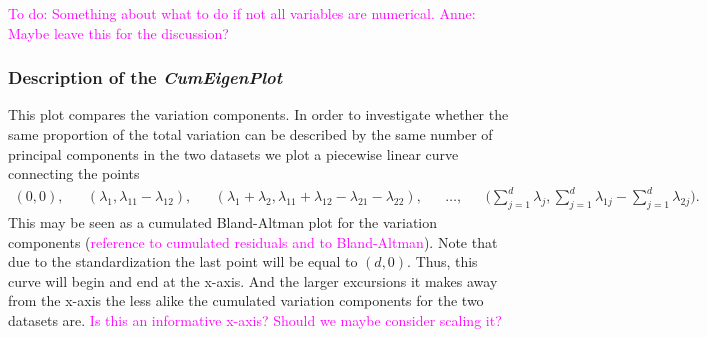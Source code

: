 \documentclass[titlepage,11pt,twoside]{article}
\newcommand{\hl}[1]{\textcolor{magenta}{#1}}
\newcommand{\RR}{\mathbb{R}}
\begin{document}

\hl{To do: Something about what to do if not all variables are numerical. Anne: Maybe leave this for the discussion?
}

\medskip

\subsubsection{Description of the \emph{CumEigenPlot}}
 This plot compares the variation components. 
In order to investigate whether the same proportion of the total variation can be described by the same number of principal components in the two datasets we plot a piecewise linear curve connecting the points
\begin{align*}
(0,0), &&
(\lambda_1,\lambda_{11}-\lambda_{12}), &&
(\lambda_1 + \lambda_2,\lambda_{11}+\lambda_{12}-\lambda_{21}-\lambda_{22}), &&
\ldots, &&
\bigg( \sum_{j=1}^d \lambda_j, \sum_{j=1}^d \lambda_{1j} - \sum_{j=1}^d \lambda_{2j} \bigg).
\end{align*}
This may be seen as a cumulated Bland-Altman plot for the variation components (\hl{reference to cumulated residuals and to Bland-Altman}). Note that due to the standardization the last point will be equal to $(d,0)$. Thus, this curve will begin and end at the x-axis. And the larger excursions it makes away from the x-axis the less alike the cumulated variation components for the two datasets are. \hl{Is this an informative x-axis? Should we maybe consider scaling it?}
\end{document}

